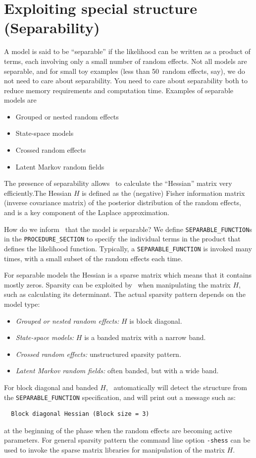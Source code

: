 \documentclass{admbmanual}
\begin{document}
\chapter{Exploiting special structure (Separability)}
\label{separability}
A model is said to be ``separable'' if the likelihood can be written
as a product of terms, each involving only a small number of random effects.
Not all models are separable, and for small toy examples (less than 50~random
effects, say), we do not need to care about separability. You
need to care about separability both to reduce memory requirements and
computation time. Examples of separable models are
\begin{itemize}
  \item Grouped or nested random effects
  \item State-space models
  \item Crossed random effects
  \item Latent Markov random fields
\end{itemize}
The presence of separability allows \scAB\ to calculate the ``Hessian'' matrix
very efficiently.The Hessian $H$ is defined as the (negative) Fisher information
matrix (inverse covariance matrix) of the posterior distribution of the
random effects, and is a key component of the Laplace approximation.

How do we inform \scAR\ that the model is separable? We define
\texttt{SEPARABLE\_FUNCTION}s in the \texttt{PROCEDURE\_SECTION} to specify the
individual terms in the product that defines the likelihood function. Typically,
a \texttt{SEPARABLE\_FUNCTION} is invoked many times, with a small subset of the
random effects each time.

For separable models the Hessian is a sparse matrix which means that it contains
mostly zeros. Sparsity can be exploited by \scAB\ when manipulating the matrix
$H$, such as calculating its determinant. The actual sparsity pattern depends on
the model type:
\begin{itemize}
  \item \textit{Grouped or nested random effects:} $H$ is block diagonal.
  \item \textit{State-space models:} $H$ is a banded matrix with a narrow band.
  \item \textit{Crossed random effects:} unstructured sparsity pattern.
  \item \textit{Latent Markov random fields:} often banded, but with a wide
  band.
\end{itemize}
For block diagonal and banded $H$, \scAR\ automatically will detect the
structure from the \texttt{SEPARABLE\_FUNCTION} specification, and will print
out a message such as:
\begin{lstlisting}
  Block diagonal Hessian (Block size = 3)
\end{lstlisting}
at the beginning of the phase when the random effects are becoming active
parameters. For general sparsity pattern the command line option \texttt{-shess}
can be used to invoke the sparse matrix libraries for manipulation of the matrix
$H$.
\end{document}
